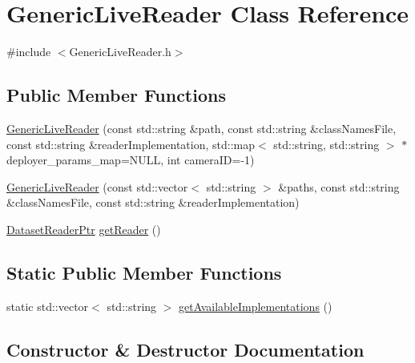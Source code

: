 \hypertarget{class_generic_live_reader}{}\section{Generic\+Live\+Reader Class Reference}
\label{class_generic_live_reader}


{\ttfamily \#include $<$Generic\+Live\+Reader.\+h$>$}

\subsection*{Public Member Functions}
\begin{DoxyCompactItemize}
\item 
\hyperlink{class_generic_live_reader_ac343dea4449fb634fd50d8f3f345e324}{Generic\+Live\+Reader} (const std\+::string \&path, const std\+::string \&class\+Names\+File, const std\+::string \&reader\+Implementation, std\+::map$<$ std\+::string, std\+::string $>$ $\ast$deployer\+\_\+params\+\_\+map=N\+U\+LL, int camera\+ID=-\/1)
\item 
\hyperlink{class_generic_live_reader_a93d5a40fbeb5f241553aa0eca08c3191}{Generic\+Live\+Reader} (const std\+::vector$<$ std\+::string $>$ \&paths, const std\+::string \&class\+Names\+File, const std\+::string \&reader\+Implementation)
\item 
\hyperlink{_dataset_reader_8h_a30d89cba514a220d64d04535c0465f1c}{Dataset\+Reader\+Ptr} \hyperlink{class_generic_live_reader_affd8e47c049501f8e83ab12aafb482ee}{get\+Reader} ()
\end{DoxyCompactItemize}
\subsection*{Static Public Member Functions}
\begin{DoxyCompactItemize}
\item 
static std\+::vector$<$ std\+::string $>$ \hyperlink{class_generic_live_reader_aaec6f0e9697d31fe2b9f836b22805aa0}{get\+Available\+Implementations} ()
\end{DoxyCompactItemize}


\subsection{Constructor \& Destructor Documentation}
\mbox{\label{class_generic_live_reader_ac343dea4449fb634fd50d8f3f345e324}} 
